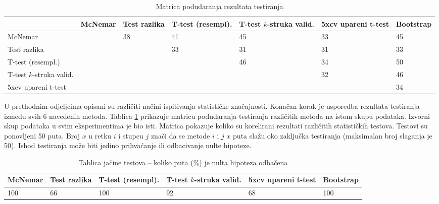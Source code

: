 \begin{center}
\begin{table}
\small
\begin{tabular}{|p{1.8cm}|p{1.6cm}|p{1.8cm}|p{1.6cm}|p{1.8cm}|p{2.2cm}|p{1.5cm}|}
\hline
& McNemar & Test razlika & T-test (resempl). & T-test $k$-struka valid. & 5xcv upareni t-test & Bootstrap \\
\hline
McNemar &  & 38 & 41 & 45 & 33 & 45 \\ \hline
Test razlika &  &  & 33 & 31 & 31 & 33 \\ \hline
T-test (resempl.) &  &  &  & 46 & 34 & 50 \\ \hline
T-test $k$-struka valid. &  &  &  &  & 32 & 46 \\ \hline
5xcv upareni t-test &  &  &  &  &  & 34 \\ \hline

\hline
\end{tabular}
\caption{Matrica podudaranja rezultata testiranja}
\label{tab:agreement_rt}
\end{table}
\end{center}

U prethodnim odjeljcima opisani su različiti načini ispitivanja statističke značajnosti. Konačan korak je usporedba rezultata testiranja između svih 6 navedenih metoda. Tablica \ref{tab:agreement_rt} prikazuje matricu podudaranja testiranja različitih metoda na istom skupu podataka. Izvorni skup podataka u svim eksperimentima je bio isti. Matrica pokazuje koliko su korelirani rezultati različitih statističkih testova. Testovi su ponovljeni 50 puta. Broj $x$ u retku $i$ i stupcu $j$ znači da se metode $i$ i $j$ $x$ puta slažu oko zaključka testiranja (maksimalan broj slaganja je 50). Ishod testiranja može biti jedino prihvaćanje ili odbacivanje nulte hipoteze. 

\begin{center}
\begin{table}
\small
\begin{tabular}{|p{1.6cm}|p{2cm}|p{2.8cm}|p{3.3cm}|p{2.2cm}|p{1.5cm}|}
\hline
McNemar & Test razlika & T-test (resempl). & T-test $k$-struka valid. & 5xcv upareni t-test & Bootstrap \\ \hline
100 & 66 & 100 & 92 & 68 & 100 \\
\hline
\end{tabular}
\caption{Tablica jačine testova -- koliko puta (\%) je nulta hipoteza odbačena }
\label{tab:reject_sum}
\end{table}
\end{center}


